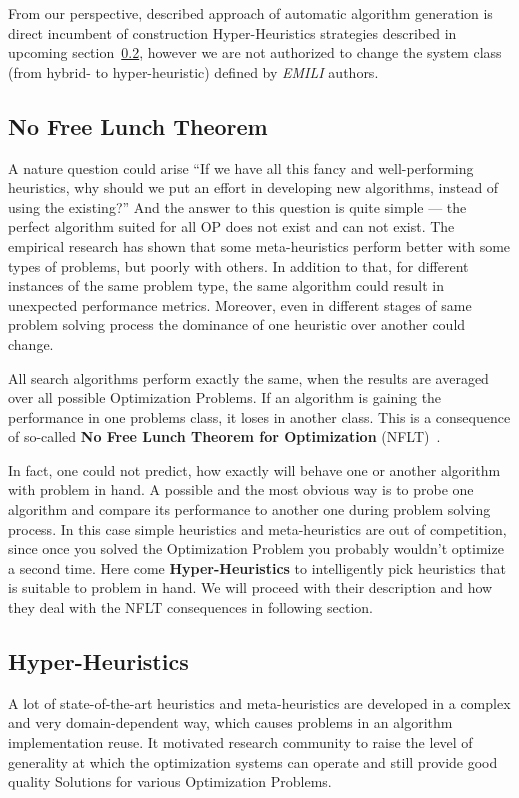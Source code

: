 From our perspective, described approach of automatic algorithm generation is direct incumbent of construction Hyper-Heuristics strategies described in upcoming section~\ref{bg: hh}, however we are not authorized to change the system class (from hybrid- to hyper-heuristic) defined by \textit{EMILI} authors.


\subsection{No Free Lunch Theorem}
A nature question could arise ``If we have all this fancy and well-performing heuristics, why should we put an effort in developing new algorithms, instead of using the existing?'' And the answer to this question is quite simple — the perfect algorithm suited for all OP does not exist and can not exist. 
The empirical research has shown that some meta-heuristics perform better with some types of problems, but poorly with others. In addition to that, for different instances of the same problem type, the same algorithm could result in unexpected performance metrics. Moreover, even in different stages of same problem solving process the dominance of one heuristic over another could change. 

All search algorithms perform exactly the same, when the results are averaged over all possible Optimization Problems. If an algorithm is gaining the performance in one problems class, it loses in another class. This is a consequence of so-called \textbf{No Free Lunch Theorem for Optimization} (NFLT)~\cite{wolpert1997no}.

In fact, one could not predict, how exactly will behave one or another algorithm with problem in hand. A possible and the most obvious way is to probe one algorithm and compare its performance to another one during problem solving process. In this case simple heuristics and meta-heuristics are out of competition, since once you solved the Optimization Problem you probably wouldn't optimize a second time.
Here come \textbf{Hyper-Heuristics} to intelligently pick heuristics that is suitable to problem in hand. We will proceed with their description and how they deal with the NFLT consequences in following section.


\subsection{Hyper-Heuristics}\label{bg: hh}
A lot of state-of-the-art heuristics and meta-heuristics are developed in a complex and very domain-dependent way, which causes problems in an algorithm implementation reuse. It motivated research community to raise the level of generality at which the optimization systems can operate and still provide good quality Solutions for various Optimization Problems. 

